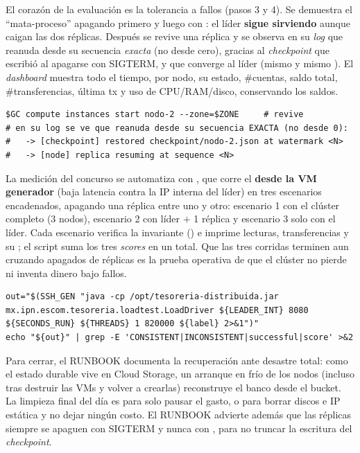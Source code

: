 El corazón de la evaluación es la tolerancia a fallos (pasos 3 y 4). Se demuestra
el ``mata-proceso'' apagando primero  y luego  con
: el líder \textbf{sigue sirviendo} aunque
caigan las dos réplicas. Después se revive una réplica y se observa en su
\emph{log} que reanuda desde su secuencia \emph{exacta} (no desde cero), gracias
al \emph{checkpoint} que escribió al apagarse con SIGTERM, y que converge al líder
(mismo  y mismo ). El \emph{dashboard}
muestra todo el tiempo, por nodo, su estado, \#cuentas, saldo total,
\#transferencias, última tx y uso de CPU/RAM/disco, conservando los saldos.

\begin{lstlisting}[language=none,caption={Revivir una replica y verificar reanudacion por secuencia (RUNBOOK paso 4, recortado)}]
$GC compute instances start nodo-2 --zone=$ZONE     # revive
# en su log se ve que reanuda desde su secuencia EXACTA (no desde 0):
#   -> [checkpoint] restored checkpoint/nodo-2.json at watermark <N>
#   -> [node] replica resuming at sequence <N>
\end{lstlisting}

La medición del concurso se automatiza con , que corre
el  \textbf{desde la VM generador} (baja latencia contra la IP
interna del líder) en tres escenarios encadenados, apagando una réplica entre uno
y otro: escenario 1 con el clúster completo (3 nodos), escenario 2 con líder $+$ 1
réplica y escenario 3 solo con el líder. Cada escenario verifica la invariante
() e imprime lecturas, transferencias y su
; el script suma los tres
\emph{scores} en un total. Que las tres corridas terminen  aun
cruzando apagados de réplicas es la prueba operativa de que el clúster no pierde
ni inventa dinero bajo fallos.

\begin{lstlisting}[language=none,caption={Un escenario del concurso sobre el generador (concurso.sh, recortado)}]
out="$(SSH_GEN "java -cp /opt/tesoreria-distribuida.jar mx.ipn.escom.tesoreria.loadtest.LoadDriver ${LEADER_INT} 8080 ${SECONDS_RUN} ${THREADS} 1 820000 ${label} 2>&1")"
echo "${out}" | grep -E 'CONSISTENT|INCONSISTENT|successful|score' >&2
\end{lstlisting}

Para cerrar, el RUNBOOK documenta la recuperación ante desastre total: como el
estado durable vive en Cloud Storage, un arranque en frío de los nodos (incluso
tras destruir las VMs y volver a crearlas) reconstruye el banco desde el bucket.
La limpieza final del día es  para solo pausar el gasto,
o  para borrar discos e IP estática y no dejar
ningún costo. El RUNBOOK advierte además que las réplicas siempre se apaguen con
SIGTERM y nunca con , para no truncar la escritura del
\emph{checkpoint}.

